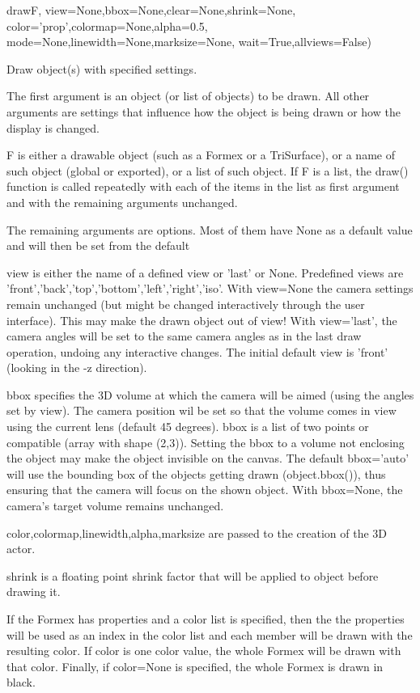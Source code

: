 \begin{funcdesc}{draw}{F, 
    view=None,bbox=None,clear=None,shrink=None,
    color='prop',colormap=None,alpha=0.5,
    mode=None,linewidth=None,marksize=None,
    wait=True,allviews=False)}
  
Draw object(s) with specified settings.

The first argument is an object (or list of objects) to be drawn. 
All other arguments are settings that influence how the object is being drawn
or how the display is changed.

F is either a drawable object (such as a Formex or a TriSurface), or a name of such object (global or exported), or a list of such object.
If F is a list, the draw() function is called repeatedly with each of
the items in the list as first argument and with the remaining arguments
unchanged.

The remaining arguments are options. Most of them have None as a default value and will then be set from the default 

view is either the name of a defined view or 'last' or None.
Predefined views are 'front','back','top','bottom','left','right','iso'.
With view=None the camera settings remain unchanged (but might be changed
interactively through the user interface). This may make the drawn object
out of view!
With view='last', the camera angles will be set to the same camera angles
as in the last draw operation, undoing any interactive changes.
The initial default view is 'front' (looking in the -z direction).

bbox specifies the 3D volume at which the camera will be aimed (using the
angles set by view). The camera position wil be set so that the volume
comes in view using the current lens (default 45 degrees).
bbox is a list of two points or compatible (array with shape (2,3)).
Setting the bbox to a volume not enclosing the object may make the object
invisible on the canvas.
The default bbox='auto' will use the bounding box of the objects getting
drawn (object.bbox()), thus ensuring that the camera will focus on the
shown object.
With bbox=None, the camera's target volume remains unchanged.

color,colormap,linewidth,alpha,marksize are passed to the
creation of the 3D actor.

shrink is a floating point shrink factor that will be applied to object
before drawing it.

If the Formex has properties and a color list is specified, then the
the properties will be used as an index in the color list and each member
will be drawn with the resulting color.
If color is one color value, the whole Formex will be drawn with
that color.
Finally, if color=None is specified, the whole Formex is drawn in black.


\end{funcdesc}
